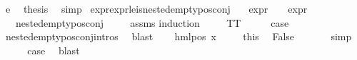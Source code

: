 \begin{isabellebody}
\ e{}\ \isamarkupfalse%
\ {\isacharquery}{\kern0pt}thesis\ \isamarkupfalse%
\ simp\isanewline
{}\isamarkupfalse%
%
\endisatagproof
{\isafoldproof}%
%
\isadelimproof
\isanewline
%
\endisadelimproof
\isanewline
{}\isamarkupfalse%
\ expr{\isacharunderscore}{\kern0pt}{}{\isacharunderscore}{\kern0pt}expr{\isacharunderscore}{\kern0pt}{}{\isacharunderscore}{\kern0pt}le{\isacharunderscore}{\kern0pt}{}{\isacharunderscore}{\kern0pt}is{\isacharunderscore}{\kern0pt}nested{\isacharunderscore}{\kern0pt}empty{\isacharunderscore}{\kern0pt}pos{\isacharunderscore}{\kern0pt}conj{\isacharcolon}{\kern0pt}\isanewline
\ \ \ {\isachardoublequoteopen}expr{\isacharunderscore}{\kern0pt}{}\ {\isasymphi}\ {\isasymle}\ {}{\isachardoublequoteclose}\ {\isachardoublequoteopen}expr{\isacharunderscore}{\kern0pt}{}\ {\isasymphi}\ {\isasymle}\ {}{\isachardoublequoteclose}\isanewline
\ \ \ {\isachardoublequoteopen}nested{\isacharunderscore}{\kern0pt}empty{\isacharunderscore}{\kern0pt}pos{\isacharunderscore}{\kern0pt}conj\ {\isasymphi}{\isachardoublequoteclose}\isanewline
%
\isadelimproof
\ \ %
\endisadelimproof
%
\isatagproof
{}\isamarkupfalse%
\ assms\isanewline
{}\isamarkupfalse%
{\isacharparenleft}{\kern0pt}induction\ {\isasymphi}{\isacharparenright}{\kern0pt}\isanewline
\ \ \isamarkupfalse%
\ TT\isanewline
\ \ \isamarkupfalse%
\ \isamarkupfalse%
\ {\isacharquery}{\kern0pt}case\ \isamarkupfalse%
\ nested{\isacharunderscore}{\kern0pt}empty{\isacharunderscore}{\kern0pt}pos{\isacharunderscore}{\kern0pt}conj{\isachardot}{\kern0pt}intros{\isacharparenleft}{\kern0pt}{}{\isacharparenright}{\kern0pt}\ \isamarkupfalse%
\ blast\isanewline
{}\isamarkupfalse%
\isanewline
\ \ \isamarkupfalse%
\ {\isacharparenleft}{\kern0pt}hml{\isacharunderscore}{\kern0pt}pos\ x{}\ {\isasymphi}{\isacharparenright}{\kern0pt}\isanewline
\ \ \isamarkupfalse%
\ this{\isacharparenleft}{\kern0pt}{}{\isacharparenright}{\kern0pt}\ \isamarkupfalse%
\ False\ \isanewline
\ \ \ \ \isamarkupfalse%
\ simp\isanewline
\ \ \isamarkupfalse%
\ \isamarkupfalse%
\ {\isacharquery}{\kern0pt}case\ \isamarkupfalse%
\ blast\isanewline
{}\isamarkupfalse%
\isanewline

\end{isabellebody}
